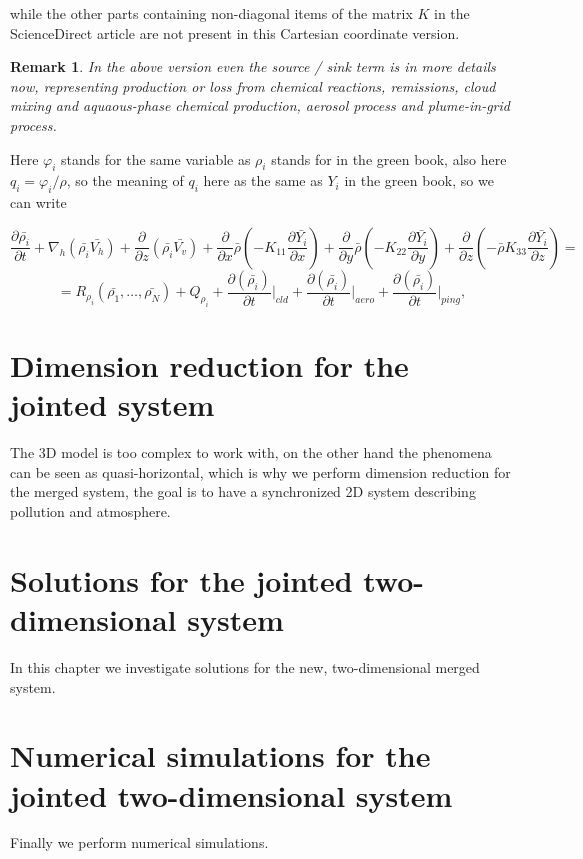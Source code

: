 \documentclass{article}
\newtheorem*{remark}{Remark}
\begin{document}
while the other parts containing non-diagonal items of the matrix $K$ in the ScienceDirect article are not present in this Cartesian coordinate version.

\begin{remark}
In the above version even the source / sink term is in more details now, representing production or loss from chemical reactions, remissions, cloud mixing and aquaous-phase chemical production, aerosol process and plume-in-grid process.
\end{remark}

Here $\varphi_i$ stands for the same variable as $\rho_i$ stands for in the green book, also here $q_i = \varphi_i / \rho$, so the meaning of $q_i$ here as the same as $Y_i$ in the green book, so we can write

 \[ \frac{\partial \bar{\rho_i}}{\partial t}  + \nabla_{h} (\bar{\rho_i} \bar{V_h}) + \frac{\partial}{\partial z} (\bar{\rho_i} \bar{V_v}) + \frac{\partial}{\partial x} \bar{\rho} (-K_{11} \frac{\partial \bar{Y_i}}{\partial x}) + \frac{\partial}{\partial y} \bar{\rho} (-K_{22} \frac{\partial \bar{Y_i}}{\partial y}) + \frac{\partial}{\partial z} (- \bar{\rho} K_{33} \frac{\partial \bar{Y_i}}{\partial z}) = \]
 \[ = R_{\rho_i} (\bar{\rho_1}, \dots , \bar{\rho_N}) + Q_{\rho_i} + \frac{\partial (\bar{\rho_i})}{\partial t} \rvert_{cld} + \frac{\partial (\bar{\rho_i})}{\partial t} \rvert_{aero} + \frac{\partial (\bar{\rho_i})}{\partial t} \rvert_{ping},\]

\section{Dimension reduction for the jointed system}
The 3D model is too complex to work with, on the other hand the phenomena can be seen as quasi-horizontal, which is why we perform dimension reduction for the merged system, the goal is to have a synchronized 2D system describing pollution and atmosphere.

\section{Solutions for the jointed two-dimensional system}
In this chapter we investigate solutions for the new, two-dimensional merged system.

\section{Numerical simulations for the jointed two-dimensional system}
Finally we perform numerical simulations.

\nocite{*}


\end{document}
